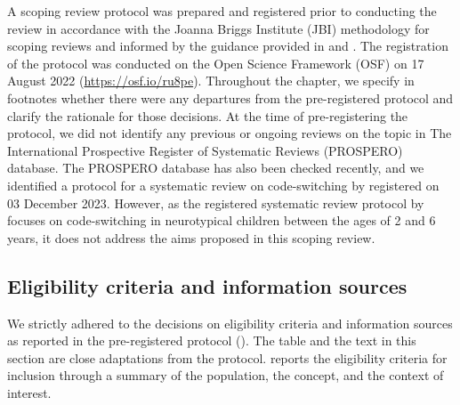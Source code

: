 \documentclass[output=paper]{langscibook}
\begin{document}
A scoping review protocol was prepared and registered prior to conducting the review in accordance with the Joanna Briggs Institute (JBI) methodology for scoping reviews and informed by the guidance provided in \citet{PetersEtAl2022} and \citet{PollockEtAl2022}. The registration of the protocol was conducted on the Open Science Framework (OSF) on 17  {August 2022} (\url{https://osf.io/ru8pe}). Throughout the chapter, we specify in footnotes whether there were any departures from the pre-registered protocol and clarify the rationale for those decisions. At the time of pre-registering the protocol, we did not identify any previous or ongoing reviews on the topic in The International Prospective Register of Systematic Reviews (PROSPERO) database. The PROSPERO database has also been checked recently, and we identified a protocol for a systematic review on code-switching by \citet{SnijdersEtAl2023} registered on 03  {December 2023}. However, as the registered systematic review protocol by \citet{SnijdersEtAl2023} focuses on code-switching in neurotypical children between the ages of 2 and 6 years, it does not address the aims proposed in this scoping review.

\subsection{Eligibility criteria and information sources}

We strictly adhered to the decisions on eligibility criteria and information sources as reported in the pre-registered protocol (\citealt{KascelanParafitaCouto2022}). The table and the text in this section are close adaptations from the protocol.  reports the eligibility criteria for inclusion through a summary of the population, the concept, and the context of interest.
\end{document}
